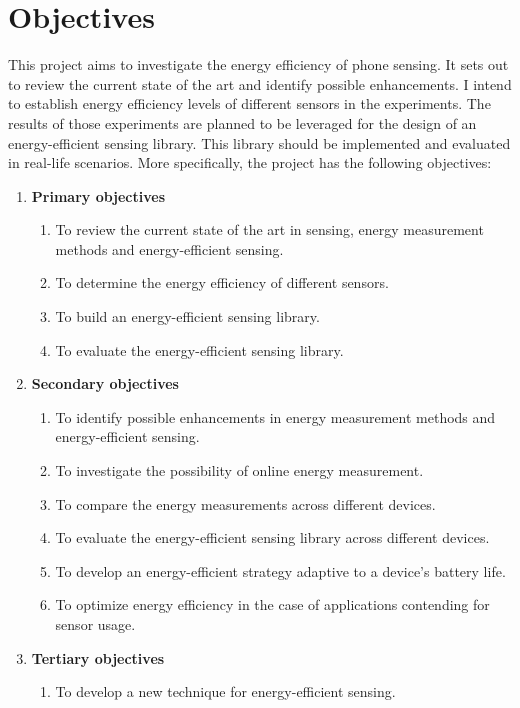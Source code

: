 \section{Objectives}
\label{s:objectives}
\hspace{10pt} This project aims to investigate the energy efficiency of phone sensing. It sets out to review the current state of the art and identify possible enhancements. I intend to establish energy efficiency levels of different sensors in the experiments. The results of those experiments are planned to be leveraged for the design of an energy-efficient sensing library. This library should be implemented and evaluated in real-life scenarios. More specifically, the project has the following objectives: 

\begin{enumerate}
 \item \textbf{Primary objectives}
  \begin{enumerate}
  	\item \label{o:survey:review}To review the current state of the art in sensing, energy measurement methods and energy-efficient sensing.
  	\item \label{o:measurements:primary}To determine the energy efficiency of different sensors.
  	\item \label{o:library:build}To build an energy-efficient sensing library.
  	\item \label{o:library:eval}To evaluate the energy-efficient sensing library.
  \end{enumerate}
  \item \textbf{Secondary objectives}
  \begin{enumerate}
  	\item \label{o:survey:enhancements}To identify possible enhancements in energy measurement methods and energy-efficient sensing.
    \item \label{o:measurements:online}To investigate the possibility of online energy measurement.
    \item \label{o:measurements:devices}To compare the energy measurements across different devices.
    \item \label{o:library:devices}To evaluate the energy-efficient sensing library across different devices.
    \item \label{o:library:battery}To develop an energy-efficient strategy adaptive to a device's battery life.
    \item \label{o:library:apps}To optimize energy efficiency in the case of applications contending for sensor usage.
  \end{enumerate}
  \item \textbf{Tertiary objectives}
  \begin{enumerate}
   \item \label{o:library:original}To develop a new technique for energy-efficient sensing.
  \end{enumerate}
\end{enumerate}
